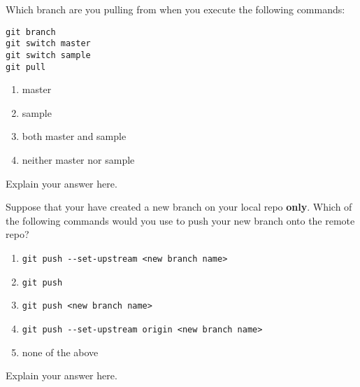\documentclass[12pt,fleqn]{examtst}
\begin{document}

\newpage
\noindent
\begin{minipage}{\textwidth}

Which branch are you pulling from when you execute the following commands:

\begin{lstlisting}
git branch
git switch master
git switch sample
git pull
\end{lstlisting}

\begin{enumerate}
    \item master
    \item sample \marker
    \item both master and sample
    \item neither master nor sample
\end{enumerate}
Explain your answer here.

Suppose that your have created a new branch on your local repo \textbf{only}. Which of the following commands would you use to push your new branch onto the remote repo?

\begin{enumerate}
    \item \lstinline{git push --set-upstream <new branch name>}
    \item \lstinline{git push}
    \item \lstinline{git push <new branch name>}
    \item \lstinline{git push --set-upstream origin <new branch name>} \marker
    \item none of the above
\end{enumerate}
Explain your answer here.

\end{minipage}
\end{document}
